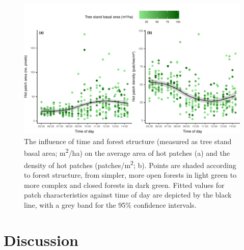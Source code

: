 \documentclass[12pt,a4paper,]{report}
\theoremstyle{definition}
\theoremstyle{definition}
\theoremstyle{definition}
\theoremstyle{remark}
\begin{document}
\begin{figure}
\includegraphics{./output/fig-3-1-1} \caption{The influence of time and forest structure (measured as
tree stand basal area; m\textsuperscript{2}/ha) on the average area of
hot patches (a) and the density of hot patches
(patches/m\textsuperscript{2}; b). Points are shaded according to forest
structure, from simpler, more open forests in light green to more
complex and closed forests in dark green. Fitted values for patch
characteristics against time of day are depicted by the black line, with
a grey band for the 95\% confidence intervals.}\label{fig:fig-3-1}
\end{figure}

\section{Discussion}\label{discussion-1}
\end{document}
